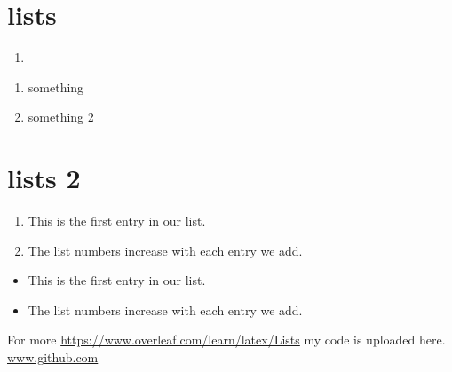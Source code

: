 \documentclass{article}
\begin{document}
\section{lists}
\begin{enumerate}
    \item 
\end{enumerate}


\begin{enumerate}
    \item something 
    \item something 2
\end{enumerate}

\section{lists 2}


\begin{enumerate}
  \item This is the first entry in our list.
  \item The list numbers increase with each entry we add.
\end{enumerate}

\begin{itemize}
   \item This is the first entry in our list.
  \item The list numbers increase with each entry we add.
\end{itemize}
For more \url{https://www.overleaf.com/learn/latex/Lists}
my code is uploaded here. \url{www.github.com}
\end{document}

